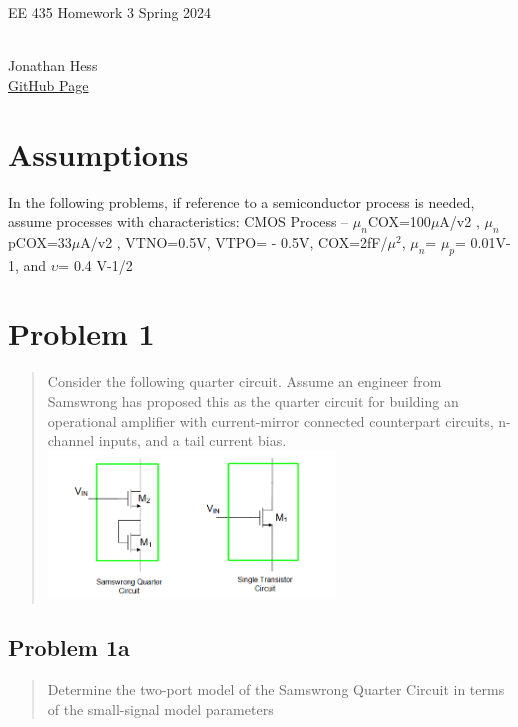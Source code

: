 \documentclass[10pt,a4paper]{article}
\author{}
\date{}
\let\oldsubsection\subsection
\renewcommand{\subsection}{%
    \setcounter{equation}{0}%
    \oldsubsection%
}
\begin{document}
\begin{flushleft}
\begin{LARGE}EE 435 Homework 3 Spring 2024
\end{LARGE}
\\Jonathan Hess
\\\href{https://github.com/Jetsama/EE435/tree/main/HW3}{GitHub Page}
\end{flushleft}

\section{Assumptions}
In the following problems, if reference to a semiconductor process is needed, assume
processes with characteristics: CMOS Process -- $\mu_n$COX=100$\mu$A/v2 , $\mu_n$pCOX=33$\mu$A/v2 ,
VTNO=0.5V,
 VTPO= - 0.5V,
  COX=2fF/$\mu^2$,
   $\mu_n$= $\mu_p$= 0.01V-1,
    and $\upsilon$= 0.4 V-1/2

\section{Problem 1}
\begin{quote}
Consider the following quarter circuit. Assume an engineer from
Samswrong has proposed this as the quarter circuit for building an operational amplifier
with current-mirror connected counterpart circuits, n-channel inputs, and a tail current
bias.\\
\includegraphics[width=3in]{images/Problem1.png} \\
\end{quote}

\subsection{Problem 1a}
\begin{quote}

Determine the two-port model of the Samswrong Quarter Circuit in terms of the small-signal model parameters\\

\end{quote}
\end{document}
